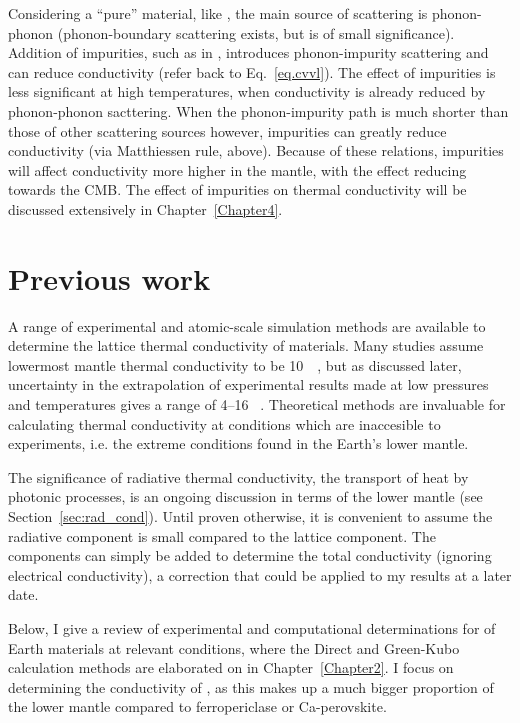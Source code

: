 Considering a ``pure'' material, like \mgsios \bdg, the main source of scattering is phonon-phonon (phonon-boundary scattering exists, but is of small significance). Addition of impurities, such as in \mgfesios \pv, introduces phonon-impurity scattering and can reduce conductivity (refer back to Eq.~\ref{eq.cvvl}). The effect of impurities is less significant at high temperatures, when conductivity is already reduced by phonon-phonon sacttering. When the phonon-impurity path is much shorter than those of other scattering sources however, impurities can greatly reduce conductivity (via Matthiessen rule, above). Because of these relations, impurities will affect conductivity more higher in the mantle, with the effect reducing towards the CMB. The effect of impurities on thermal conductivity will be discussed extensively in Chapter~\ref{Chapter4}.





\section{\label{sec:kappa_range}Previous work}

A range of experimental and atomic-scale simulation methods are available to determine the lattice thermal conductivity of materials. Many studies assume lowermost mantle thermal conductivity to be 10~\wmk\ \citep[e.g.][]{Lay2008}, but as discussed later, uncertainty in the extrapolation of experimental results made at low pressures and temperatures gives a range of 4--16 \wmk~\citep{Brown1986a, Osako1991, Hofmeister1999, Goncharov2009, Manthilake2011}. Theoretical methods are invaluable for calculating thermal conductivity at conditions which are inaccesible to experiments, i.e. the extreme conditions found in the Earth's lower mantle. 

The significance of radiative thermal conductivity, the transport of heat by photonic processes, is an ongoing discussion in terms of the lower mantle (see Section~\ref{sec:rad_cond}). Until proven otherwise, it is convenient to assume the radiative component is small compared to the lattice component. The components can simply be added to determine the total conductivity (ignoring electrical conductivity), a correction that could be applied to my results at a later date.

Below, I give a review of experimental and computational determinations for \tcs of Earth materials at relevant conditions, where the Direct and Green-Kubo calculation methods are elaborated on in Chapter~\ref{Chapter2}. I focus on determining the conductivity of \bdg, as this makes up a much bigger proportion of the lower mantle compared to ferropericlase or Ca-perovskite.

